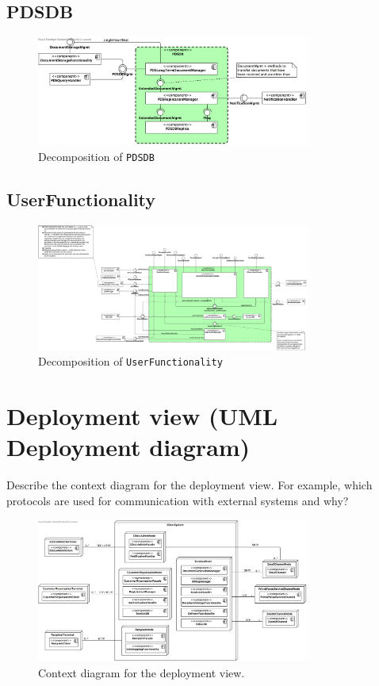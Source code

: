 \documentclass[a4paper,10pt]{article}
\begin{document}
\subsection{PDSDB}\label{subsec:decomp-PDSDB}
\begin{figure}[!htp]
	\centering
	\includegraphics[width=0.8\textwidth]{PDSDB.png}
	\caption{Decomposition of \texttt{PDSDB}}
	\label{fig:decomp-PDSDB}
\end{figure}
\FloatBarrier

\subsection{UserFunctionality}\label{subsec:decomp-UserFunctionality}
\begin{figure}[!htp]
	\centering
	\includegraphics[width=0.8\textwidth]{UserFunctionality.png}
	\caption{Decomposition of \texttt{UserFunctionality}}
	\label{fig:decomp-UserFunctionality}
\end{figure}
\FloatBarrier

\section{Deployment view (UML Deployment diagram)}\label{sec:deployment}
Describe the context diagram for the deployment view.
For example, which protocols are used for communication with external systems
and why?

\begin{figure}[!htp]
	\centering
	\includegraphics[width=0.8\textwidth]{ContextDeployment.png}
    \caption{Context diagram for the deployment view.}
    \label{fig:depl_context}
\end{figure}
\FloatBarrier
\end{document}
